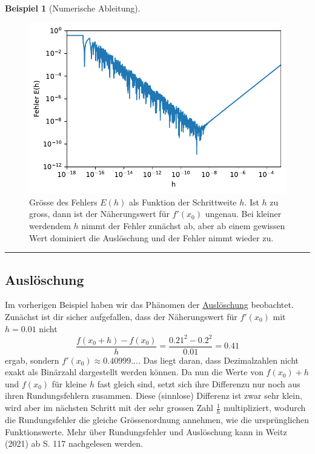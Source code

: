 \documentclass[
  letterpaper,
  DIV=11]{scrreprt}
\theoremstyle{definition}
\newtheorem{example}{Beispiel}[chapter]
\theoremstyle{remark}
\begin{document}
\begin{example}[Numerische Ableitung]
\begin{figure}[H]
{\centering \includegraphics{./notAD_files/figure-pdf/fig-numdiffproblem-output-1.pdf}

}

\caption{\label{fig-numdiffproblem}Grösse des Fehlers \(E(h)\) als
Funktion der Schrittweite \(h\). Ist \(h\) zu gross, dann ist der
Näherungswert für \(f'(x_0)\) ungenau. Bei kleiner werdendem \(h\) nimmt
der Fehler zunächst ab, aber ab einem gewissen Wert dominiert die
Auslöschung und der Fehler nimmt wieder zu.}

\end{figure}

\begin{center}\rule{0.5\linewidth}{0.5pt}\end{center}

\end{example}

\hypertarget{ausluxf6schung}{%
\subsection{Auslöschung}\label{ausluxf6schung}}

Im vorherigen Beispiel haben wir das Phänomen der
\href{https://de.wikipedia.org/wiki/Ausl\%C3\%B6schung_(numerische_Mathematik)}{Auslöschung}
beobachtet. Zunächst ist dir sicher aufgefallen, dass der Näherungswert
für \(f'(x_0)\) mit \(h=0.01\) nicht
\[ \frac{f(x_0 + h) - f(x_0)}{h} = \frac{0.21^2 - 0.2^2}{0.01}=0.41\]
ergab, sondern \(f'(x_0)\approx 0.40999...\). Das liegt daran, dass
Dezimalzahlen nicht exakt als Binärzahl dargestellt werden können. Da
nun die Werte von \(f(x_0) + h\) und \(f(x_0)\) für kleine \(h\) fast
gleich sind, setzt sich ihre Differenzu nur noch aus ihren
Rundungsfehlern zusammen. Diese (sinnlose) Differenz ist zwar sehr
klein, wird aber im nächsten Schritt mit der sehr grossen Zahl
\(\frac{1}{h}\) multipliziert, wodurch die Rundungsfehler die gleiche
Grössenordnung annehmen, wie die ursprünglichen Funktionswerte. Mehr
über Rundungsfehler und Auslöschung kann in Weitz (2021) ab S. 117
nachgelesen werden.
\end{document}
